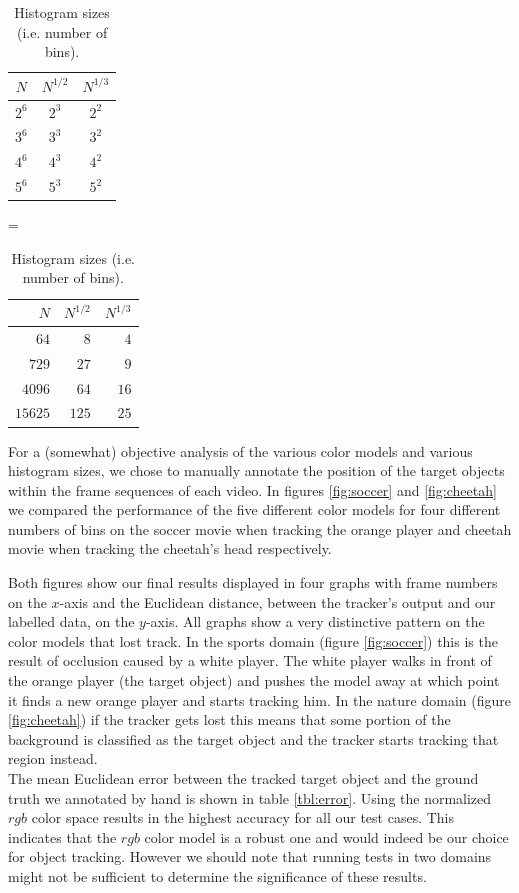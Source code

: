 \documentclass[11pt]{article}
\begin{document}
\begin{table}[h!]
\centering
\begin{tabular}{c|c|c}
$N$   & $N^{1/2}$ & $N^{1/3}$\\\hline\hline
$2^6$ & $2^3$     & $2^2$\\\hline
$3^6$ & $3^3$     & $3^2$\\\hline
$4^6$ & $4^3$     & $4^2$\\\hline
$5^6$ & $5^3$     & $5^2$\\
\end{tabular}
=
\begin{tabular}{r|r|r}
$N$     & $N^{1/2}$ & $N^{1/3}$\\\hline\hline
$64$    & $8$       & $4$\\\hline
$729$   & $27$      & $9$\\\hline
$4096$  & $64$      & $16$\\\hline
$15625$ & $125$     & $25$\\
\end{tabular}
\caption{Histogram sizes (i.e. number of bins).}
\label{tbl:bins}
\end{table}

For a (somewhat) objective analysis of the various color models and various
histogram sizes, we chose to manually annotate the position of the target
objects within the frame sequences of each video. In figures \ref{fig:soccer}
and \ref{fig:cheetah} we compared the performance of
the five different color models for four different numbers of bins on the soccer
movie when tracking the orange player and cheetah movie when tracking the
cheetah's head respectively.

Both figures show our final results displayed in
four graphs with frame numbers on the $x$-axis and the Euclidean distance,
between the tracker's output and our labelled data, on the $y$-axis. All graphs
show a very distinctive pattern on the color models that lost track. In the
sports domain (figure \ref{fig:soccer}) this is the result of occlusion caused by
a white player. The white player walks in front of the orange player (the
target object) and pushes the model away at which point it finds a new orange
player and starts tracking him. In the nature domain (figure \ref{fig:cheetah})
if the tracker gets lost this means that some portion of the background is
classified as the target object and the tracker starts tracking that region
instead.\\

The mean Euclidean error between the tracked target object and the ground truth
we annotated by hand is shown in table \ref{tbl:error}. Using the normalized
$rgb$ color space results in the highest accuracy for all our test cases.
This indicates that the $rgb$ color model is a robust one and would indeed be
our choice for object tracking. However we should note that running tests in two
domains might not be sufficient to determine the significance of these results.
\end{document}
